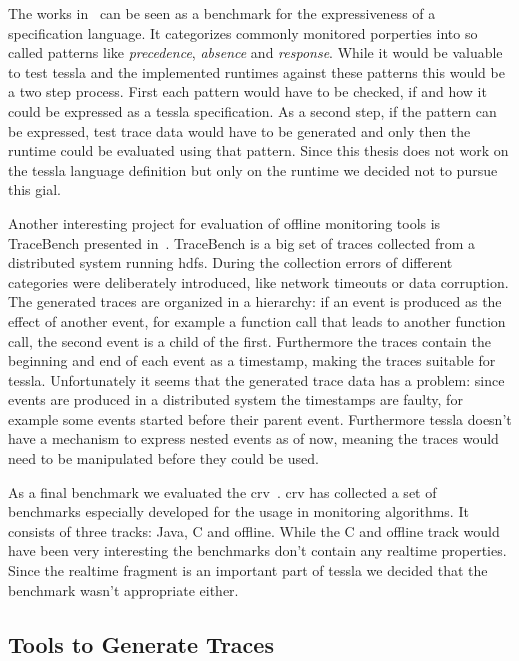 The works in~\cite{Dwyer1999} can be seen as a benchmark for the expressiveness of a specification language.
It categorizes commonly monitored porperties into so called patterns like \emph{precedence}, \emph{absence} and \emph{response}.
While it would be valuable to test \gls{tessla} and the implemented runtimes against these patterns this would be a two step process.
First each pattern would have to be checked, if and how it could be expressed as a \gls{tessla} specification.
As a second step, if the pattern can be expressed, test trace data would have to be generated and only then the runtime could be evaluated using that pattern.
Since this thesis does not work on the \gls{tessla} language definition but only on the runtime we decided not to pursue this gial.

Another interesting project for evaluation of offline monitoring tools is TraceBench presented in~\cite{Zhou2014}.
TraceBench is a big set of traces collected from a distributed system running \gls{hdfs}.
During the collection errors of different categories were deliberately introduced, like network timeouts or data corruption.
The generated traces are organized in a hierarchy: if an event is produced as the effect of another event, for example a function call that leads to another function call, the second event is a child of the first.
Furthermore the traces contain the beginning and end of each event as a timestamp, making the traces suitable for \gls{tessla}.
Unfortunately it seems that the generated trace data has a problem: since events are produced in a distributed system the timestamps are faulty, for example some events started before their parent event.
Furthermore \gls{tessla} doesn't have a mechanism to express nested events as of now, meaning the traces would need to be manipulated before they could be used.

As a final benchmark we evaluated the \gls{crv}~\citep{Reger2016}.
\Gls{crv} has collected a set of benchmarks especially developed for the usage in monitoring algorithms.
It consists of three tracks: Java, C and offline.
While the C and offline track would have been very interesting the benchmarks don't contain any realtime properties.
Since the realtime fragment is an important part of \gls{tessla} we decided that the benchmark wasn't appropriate either.

\subsection{Tools to Generate Traces}

